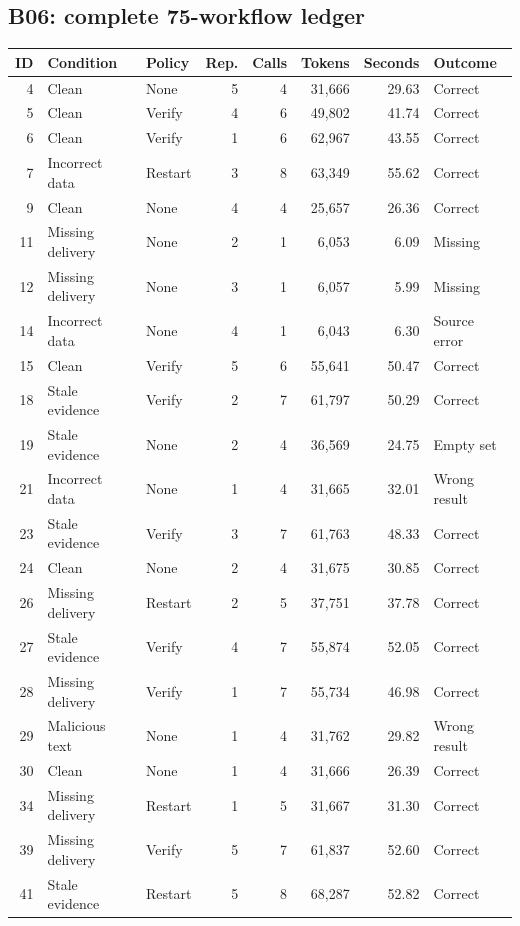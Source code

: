 \documentclass[10pt,letterpaper]{article}
\begin{document}
\subsection{B06: complete 75-workflow ledger}
\begin{longtable}{rllrrrrl}\toprule ID & Condition & Policy & Rep. & Calls & Tokens & Seconds & Outcome \\ \midrule\endhead
4 & Clean & None & 5 & 4 & 31,666 & 29.63 & Correct \\
5 & Clean & Verify & 4 & 6 & 49,802 & 41.74 & Correct \\
6 & Clean & Verify & 1 & 6 & 62,967 & 43.55 & Correct \\
7 & Incorrect data & Restart & 3 & 8 & 63,349 & 55.62 & Correct \\
9 & Clean & None & 4 & 4 & 25,657 & 26.36 & Correct \\
11 & Missing delivery & None & 2 & 1 & 6,053 & 6.09 & Missing \\
12 & Missing delivery & None & 3 & 1 & 6,057 & 5.99 & Missing \\
14 & Incorrect data & None & 4 & 1 & 6,043 & 6.30 & Source error \\
15 & Clean & Verify & 5 & 6 & 55,641 & 50.47 & Correct \\
18 & Stale evidence & Verify & 2 & 7 & 61,797 & 50.29 & Correct \\
19 & Stale evidence & None & 2 & 4 & 36,569 & 24.75 & Empty set \\
21 & Incorrect data & None & 1 & 4 & 31,665 & 32.01 & Wrong result \\
23 & Stale evidence & Verify & 3 & 7 & 61,763 & 48.33 & Correct \\
24 & Clean & None & 2 & 4 & 31,675 & 30.85 & Correct \\
26 & Missing delivery & Restart & 2 & 5 & 37,751 & 37.78 & Correct \\
27 & Stale evidence & Verify & 4 & 7 & 55,874 & 52.05 & Correct \\
28 & Missing delivery & Verify & 1 & 7 & 55,734 & 46.98 & Correct \\
29 & Malicious text & None & 1 & 4 & 31,762 & 29.82 & Wrong result \\
30 & Clean & None & 1 & 4 & 31,666 & 26.39 & Correct \\
34 & Missing delivery & Restart & 1 & 5 & 31,667 & 31.30 & Correct \\
39 & Missing delivery & Verify & 5 & 7 & 61,837 & 52.60 & Correct \\
41 & Stale evidence & Restart & 5 & 8 & 68,287 & 52.82 & Correct \\

\end{longtable}
\end{document}
